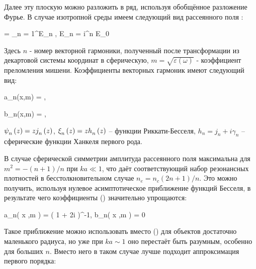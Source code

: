
Далее эту плоскую можно разложить в ряд, используя обобщённое разложение Фурье. В случае изотропной среды имеем следующий вид рассеянного поля \cite{boren_huffman}:

    \eq
		 = \sum_{n = 1}^{\infty}E_n , \qquad E_n = i^{n} E_0 
        \label{E_s_sph}
	\qe

Здесь $n$ - номер векторной гармоники, полученный после трансформации из декартовой системы координат в сферическую, $m = \sqrt{\varepsilon\left(\omega\right)}$ - коэффициент преломления мишени. Коэффициенты векторных гармоник имеют следующий вид:


    \eq
		a_n(x,\:m) = ,
		\label{an_bessel}
	\qe

    \eq
        b_n(x,\:m) = ,
        \label{bn_bessel}
    \qe

 ${\psi}_{n}^{} \left( {z} \right) = z {j}_{n}^{} \left( {z} \right)$, ${\xi}_{n}^{} \left( {z} \right) = z {h}_{n}^{} \left( {z} \right)$ -- функции Риккати-Бесселя, $h_n = j_n + i \gamma_n$ -- сферические функции Ханкеля первого рода.

В случае сферической симметрии амплитуда рассеянного поля максимальна для $m^2 = - (n+ 1) / n$ при $ka \ll 1$, что даёт соответствующий набор резонансных плотностей в бесстолкновительном случае $n_e = n_c(2n + 1) / n$. Это можно получить, используя нулевое асимптотическое приближение функций Бесселя, в результате чего коэффициенты () значительно упрощаются:

    \eq
        a_n\left( x ,\:m \right) = \left( 1 + 2i    \right)^{-1}, \qquad b_n\left( x ,\:m \right) = 0
        \label{ab_asymp}
    \qe

Такое приближение можно использовать вместо () для объектов достаточно маленького радиуса, но уже при $ka \sim 1$ оно перестаёт быть разумным, особенно для больших $n$. Вместо него в таком случае лучше подходит аппроксимация первого порядка:

